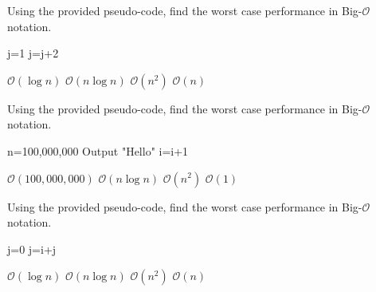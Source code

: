\documentclass{exam}
\newcommand{\itemSpace}{36pt} %
\begin{document}
\begin{questions}
\setlength\itemsep{\itemSpace} %

\question Using the provided pseudo-code, find the worst case performance in Big-$\mathcal{O}$ notation.
        \begin{algorithm}[H]
        \caption{Some messy pseudo-code}\label{algor1}
            \begin{algorithmic}[1]
                        \State j=1
                            \State j=j+2
                        \EndWhile
                    \EndFor
                \EndProcedure
            \end{algorithmic}
        \end{algorithm}
    \begin{oneparchoices}
        \choice $\mathcal{O}(\log n)$
        \choice $\mathcal{O}(n\log n)$
        \CorrectChoice $\mathcal{O}(n^{2})$
        \choice $\mathcal{O}(n)$
    \end{oneparchoices}
    
\question Using the provided pseudo-code, find the worst case performance in Big-$\mathcal{O}$ notation.
        \begin{algorithm}[H]
        \caption{Some more messy pseudocode}\label{algor2}
            \begin{algorithmic}[1]
                    \State n=100,000,000
                        \State Output "Hello"
                        \State i=i+1
                    \EndFor
                \EndProcedure
            \end{algorithmic}
        \end{algorithm}
    \begin{oneparchoices}
        \choice $\mathcal{O}(100,000,000)$
        \choice $\mathcal{O}(n\log n)$
        \choice $\mathcal{O}(n^{2})$
        \CorrectChoice $\mathcal{O}(1)$
    \end{oneparchoices}

\question Using the provided pseudo-code, find the worst case performance in Big-$\mathcal{O}$ notation.
        \begin{algorithm}[H]
        \caption{Some more messy pseudocode}\label{algor2}
            \begin{algorithmic}[1]
                    \State j=0
                        \State j=i+j
                    \EndFor
                \EndProcedure
            \end{algorithmic}
        \end{algorithm}
    \begin{oneparchoices}
        \choice $\mathcal{O}(\log n)$
        \choice $\mathcal{O}(n\log n)$
        \choice $\mathcal{O}(n^{2})$
        \CorrectChoice $\mathcal{O}(n)$
    \end{oneparchoices}



\end{questions}
\end{document}
